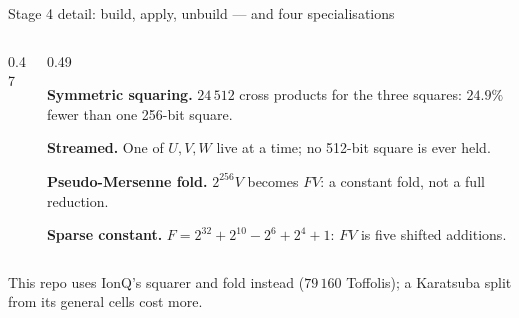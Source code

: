 \documentclass[aspectratio=169,11pt]{beamer}
\begin{document}
\begin{frame}{Stage 4 detail: build, apply, unbuild --- and four specialisations}
  \begin{columns}[T]
    \begin{column}{0.47\textwidth}
      \centering
    \end{column}
    \begin{column}{0.49\textwidth}
      \footnotesize
      \begin{panel}[colback=arfill]\textbf{Symmetric squaring.} $24\,512$ cross products for the three squares: $24.9\%$ fewer than one 256-bit square.\end{panel}
      \begin{panel}[colback=okfill]\textbf{Streamed.} One of $U,V,W$ live at a time; no 512-bit square is ever held.\end{panel}
      \begin{panel}[colback=lkfill]\textbf{Pseudo-Mersenne fold.} $2^{256}V$ becomes $FV$: a constant fold, not a full reduction.\end{panel}
      \begin{panel}[colback=opfill]\textbf{Sparse constant.} $F=2^{32}+2^{10}-2^6+2^4+1$: $FV$ is five shifted additions.\end{panel}
    \end{column}
  \end{columns}
  \vskip1mm
  {\small This repo uses IonQ's squarer and fold instead ($79\,160$ Toffolis); a Karatsuba split from its general cells cost more.}
\end{frame}
\end{document}
